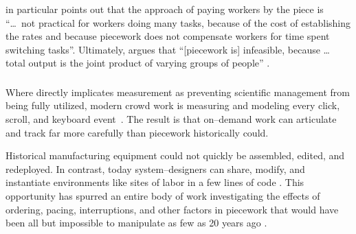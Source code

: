 \documentclass[trackingWork]{subfiles}
\begin{document}
\citeauthor{bewley1999wages} in particular points out that
the approach of paying workers by the piece is
``\dots~not practical for workers doing many tasks, because of
the cost of establishing the rates and because
piecework does not compensate workers for time spent switching tasks''.
Ultimately, \citeauthor{bewley1999wages} argues that
``[piecework is] infeasible, because \dots
total output is the joint product of varying groups of people''
\cite{bewley1999wages}.


\subsubsection{\whatchanged}
\begin{comment}
outline
	- measurement is more precise, so decomposition is deeper
	- not a single position, but a marketplace
\end{comment}

Where \citeauthor{10.2307/23702539} directly implicates measurement as
preventing scientific management from being fully utilized,
modern crowd work is measuring and modeling every click, scroll, and keyboard event~\cite{rzeszotarski2011instrumenting,rzeszotarski2012crowdscape}.
The result is that on--demand work can articulate and track far more carefully than piecework historically could.

Historical manufacturing equipment could not quickly be assembled, edited, and redeployed.
In contrast, today system--designers can share, modify, and instantiate environments
like sites of labor in a few lines of code
\cite{lessig2006code,turkitLittle}.
This opportunity has spurred an entire body of work investigating the effects of
ordering,
pacing,
interruptions, and
other factors in piecework that would have been
all but impossible to manipulate as few as 20 years ago
\cite{dai2015and,Cai:2016:CRI:2858036.2858237,cheng2015break,measuringCrowdsourcingCheng,embracingErrorKrishna}.
 
\end{document}
